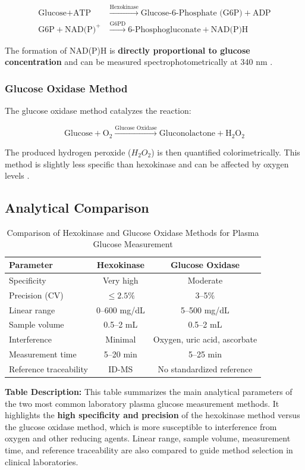 \documentclass[12pt,a4paper]{article}  %
\begin{document}
\begin{align}
\text{Glucose} + \text{ATP} &\xrightarrow{\text{Hexokinase}} \text{Glucose-6-Phosphate (G6P)} + \text{ADP} \\
\text{G6P} + \text{NAD(P)}^+ &\xrightarrow{\text{G6PD}} 6\text{-Phosphogluconate} + \text{NAD(P)H}
\end{align}

The formation of NAD(P)H is \textbf{directly proportional to glucose concentration} and can be measured spectrophotometrically at 340 nm \cite{StatPearls2025}.

\subsubsection{Glucose Oxidase Method}
The glucose oxidase method catalyzes the reaction:

\[
\text{Glucose} + \text{O}_2 \xrightarrow{\text{Glucose Oxidase}} \text{Gluconolactone} + \text{H}_2\text{O}_2
\]

The produced hydrogen peroxide (\(H_2O_2\)) is then quantified colorimetrically. This method is slightly less specific than hexokinase and can be affected by oxygen levels \cite{Sacks2011}.

\subsection{Analytical Comparison}
\begin{table}[h!]
\centering
\caption{Comparison of Hexokinase and Glucose Oxidase Methods for Plasma Glucose Measurement}
\begin{tabular}{l c c}
\hline
\textbf{Parameter} & \textbf{Hexokinase} & \textbf{Glucose Oxidase} \\
\hline
Specificity & Very high & Moderate \\
Precision (CV) & $\leq 2.5\%$ & 3--5\% \\
Linear range & 0--600 mg/dL & 5--500 mg/dL \\
Sample volume & 0.5--2 mL & 0.5--2 mL \\
Interference & Minimal & Oxygen, uric acid, ascorbate \\
Measurement time & 5--20 min & 5--25 min \\
Reference traceability & ID-MS & No standardized reference \\
\hline
\end{tabular}
\label{tab:method_comparison}
\end{table}
\noindent
\textbf{Table Description:} This table summarizes the main analytical parameters of the two most common laboratory plasma glucose measurement methods. It highlights the \textbf{high specificity and precision} of the hexokinase method versus the glucose oxidase method, which is more susceptible to interference from oxygen and other reducing agents. Linear range, sample volume, measurement time, and reference traceability are also compared to guide method selection in clinical laboratories.
\end{document}

